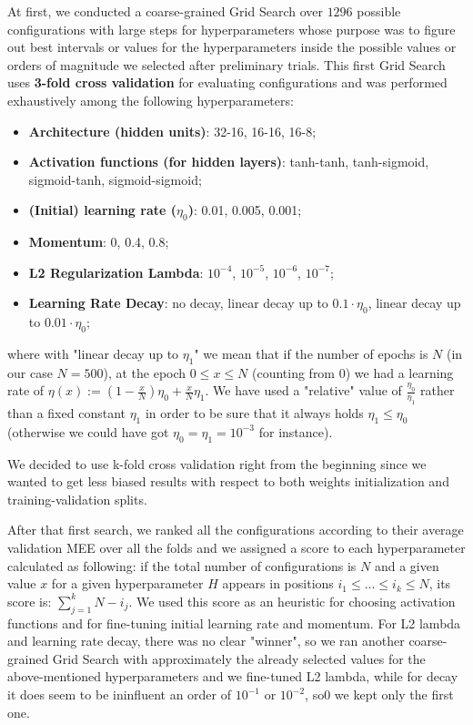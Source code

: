 At first, we conducted a coarse-grained Grid Search over $1296$ possible configurations with large steps for hyperparameters whose purpose was to figure out best intervals or values for the hyperparameters inside the possible values or orders of magnitude we selected after preliminary trials. This first Grid Search uses \textbf{3-fold cross validation} for evaluating configurations and was performed exhaustively among the following hyperparameters:
\begin{itemize}
    \item \textbf{Architecture (hidden units)}: 32-16, 16-16, 16-8;
    \item \textbf{Activation functions (for hidden layers)}: tanh-tanh, tanh-sigmoid, sigmoid-tanh, sigmoid-sigmoid;
    \item \textbf{(Initial) learning rate ($\eta_0$)}: 0.01, 0.005, 0.001;
    \item \textbf{Momentum}: 0, 0.4, 0.8;
    \item \textbf{L2 Regularization Lambda}: $10^{-4}$, $10^{-5}$, $10^{-6}$, $10^{-7}$;
    \item \textbf{Learning Rate Decay}: no decay, linear decay up to $0.1 \cdot \eta_0$, linear decay up to $0.01 \cdot \eta_0$;
\end{itemize}

where with "linear decay up to $\eta_1$" we mean that if the number of epochs is $N$ (in our case $N = 500$), at the epoch $0 \leq x \le N$ (counting from $0$) we had a learning rate of $\eta(x) := \left(1 - \frac{x}{N}\right)\eta_0 + \frac{x}{N} \eta_1$. We have used a "relative" value of $\frac{\eta_0}{\eta_1}$ rather than a fixed constant $\eta_1$ in order to be sure that it always holds $\eta_1 \leq \eta_0$ (otherwise we could have got $\eta_0 = \eta_1 = 10^{-3}$ for instance).

We decided to use k-fold cross validation right from the beginning since we wanted to get less biased results with respect to both weights initialization and training-validation splits.

After that first search, we ranked all the configurations according to their average validation MEE over all the folds and we assigned a score to each hyperparameter calculated as following: if the total number of configurations is $N$ and a given value $x$ for a given hyperparameter $H$ appears in positions $i_1 \leq ... \leq i_k \leq N$, its score is: $\sum_{j=1}^{k}{N - i_j}$. We used this score as an heuristic for choosing activation functions and for fine-tuning initial learning rate and momentum. For L2 lambda and learning rate decay, there was no clear "winner", so we ran another coarse-grained Grid Search with approximately the already selected values for the above-mentioned hyperparameters and we fine-tuned L2 lambda, while for decay it does seem to be ininfluent an order of $10^{-1}$ or $10^{-2}$, so0 we kept only the first one.

